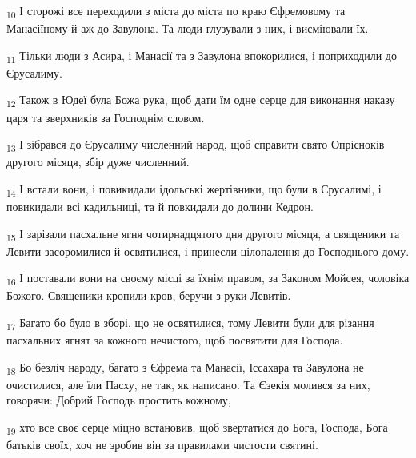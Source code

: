 \begin{tcolorbox}
\textsubscript{10} І сторожі все переходили з міста до міста по краю Єфремовому та Манасіїному й аж до Завулона. Та люди глузували з них, і висміювали їх.
\end{tcolorbox}
\begin{tcolorbox}
\textsubscript{11} Тільки люди з Асира, і Манасії та з Завулона впокорилися, і поприходили до Єрусалиму.
\end{tcolorbox}
\begin{tcolorbox}
\textsubscript{12} Також в Юдеї була Божа рука, щоб дати їм одне серце для виконання наказу царя та зверхників за Господнім словом.
\end{tcolorbox}
\begin{tcolorbox}
\textsubscript{13} І зібрався до Єрусалиму численний народ, щоб справити свято Опрісноків другого місяця, збір дуже численний.
\end{tcolorbox}
\begin{tcolorbox}
\textsubscript{14} І встали вони, і повикидали ідольські жертівники, що були в Єрусалимі, і повикидали всі кадильниці, та й повкидали до долини Кедрон.
\end{tcolorbox}
\begin{tcolorbox}
\textsubscript{15} І зарізали пасхальне ягня чотирнадцятого дня другого місяця, а священики та Левити засоромилися й освятилися, і принесли цілопалення до Господнього дому.
\end{tcolorbox}
\begin{tcolorbox}
\textsubscript{16} І поставали вони на своєму місці за їхнім правом, за Законом Мойсея, чоловіка Божого. Священики кропили кров, беручи з руки Левитів.
\end{tcolorbox}
\begin{tcolorbox}
\textsubscript{17} Багато бо було в зборі, що не освятилися, тому Левити були для різання пасхальних ягнят за кожного нечистого, щоб посвятити для Господа.
\end{tcolorbox}
\begin{tcolorbox}
\textsubscript{18} Бо безліч народу, багато з Єфрема та Манасії, Іссахара та Завулона не очистилися, але їли Пасху, не так, як написано. Та Єзекія молився за них, говорячи: Добрий Господь простить кожному,
\end{tcolorbox}
\begin{tcolorbox}
\textsubscript{19} хто все своє серце міцно встановив, щоб звертатися до Бога, Господа, Бога батьків своїх, хоч не зробив він за правилами чистости святині.
\end{tcolorbox}
